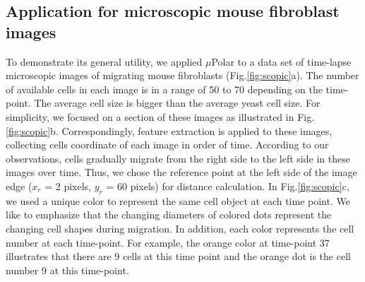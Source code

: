 \documentclass[conference]{IEEEtran}
\begin{document}
\subsection{Application for microscopic mouse fibroblast images}
 To demonstrate its general utility, we applied $\mu$Polar to a data set of time-lapse microscopic images of  migrating mouse fibroblasts (Fig.\ref{fig:scopic}a). The number of available cells in each image is in a range of 50 to 70 depending on the time-point. The average cell size is bigger than the average yeast cell size. For simplicity, we focused on a section of these images as illustrated in Fig.\ref{fig:scopic}b. Correspondingly, feature extraction is applied to these images, collecting cells coordinate of each image in order of time. According to our observations, cells gradually migrate from the right side to the left side in these images over time. Thus, we chose the reference point at the left side of the image edge ($x_r$ = 2 pixels, $y_r$ = 60 pixels) for distance calculation. In Fig.\ref{fig:scopic}c, we used a unique color to represent the same cell object at each time point. We like to emphasize that the changing diameters of colored dots represent the changing cell shapes during migration. In addition, each color represents the cell number at each time-point. For example, the orange color at time-point 37 illustrates that there are 9 cells at this time point and the orange dot is the cell number 9 at this time-point. 
\end{document}
